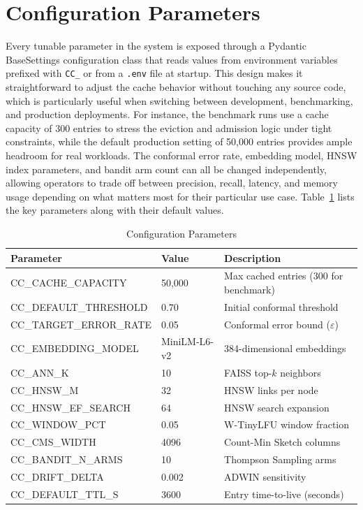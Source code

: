 \documentclass[12pt,a4paper]{report}
\begin{document}
\section{Configuration Parameters}

Every tunable parameter in the system is exposed through a Pydantic BaseSettings configuration class that reads values from environment variables prefixed with \texttt{CC\_} or from a \texttt{.env} file at startup. This design makes it straightforward to adjust the cache behavior without touching any source code, which is particularly useful when switching between development, benchmarking, and production deployments. For instance, the benchmark runs use a cache capacity of 300 entries to stress the eviction and admission logic under tight constraints, while the default production setting of 50,000 entries provides ample headroom for real workloads. The conformal error rate, embedding model, HNSW index parameters, and bandit arm count can all be changed independently, allowing operators to trade off between precision, recall, latency, and memory usage depending on what matters most for their particular use case. Table~\ref{tab:config} lists the key parameters along with their default values.

\begin{table}[H]
\centering
\begin{tabular}{lll}
\toprule
\textbf{Parameter} & \textbf{Value} & \textbf{Description} \\
\midrule
CC\_CACHE\_CAPACITY & 50,000 & Max cached entries (300 for benchmark) \\
CC\_DEFAULT\_THRESHOLD & 0.70 & Initial conformal threshold \\
CC\_TARGET\_ERROR\_RATE & 0.05 & Conformal error bound ($\varepsilon$) \\
CC\_EMBEDDING\_MODEL & MiniLM-L6-v2 & 384-dimensional embeddings \\
CC\_ANN\_K & 10 & FAISS top-$k$ neighbors \\
CC\_HNSW\_M & 32 & HNSW links per node \\
CC\_HNSW\_EF\_SEARCH & 64 & HNSW search expansion \\
CC\_WINDOW\_PCT & 0.05 & W-TinyLFU window fraction \\
CC\_CMS\_WIDTH & 4096 & Count-Min Sketch columns \\
CC\_BANDIT\_N\_ARMS & 10 & Thompson Sampling arms \\
CC\_DRIFT\_DELTA & 0.002 & ADWIN sensitivity \\
CC\_DEFAULT\_TTL\_S & 3600 & Entry time-to-live (seconds) \\
\bottomrule
\end{tabular}
\caption{Configuration Parameters}
\label{tab:config}
\end{table}
\end{document}
